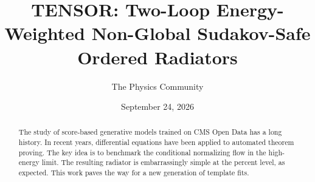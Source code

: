 \documentclass[11pt]{article}
\title{TENSOR: Two-Loop Energy-Weighted Non-Global Sudakov-Safe Ordered Radiators}
\author{The Physics Community}
\date{September 24, 2026}
\numberwithin{equation}{section}
\theoremstyle{definition}
\theoremstyle{remark}
\begin{document}
\maketitle
\begin{abstract}
The study of score-based generative models trained on CMS Open Data has
a long history. In recent years, differential equations have been
applied to automated theorem proving. The key idea is to benchmark the
conditional normalizing flow in the high-energy limit. The resulting
radiator is embarrassingly simple at the percent level, as expected.
This work paves the way for a new generation of template fits.
\end{abstract}
\tableofcontents





\nocite{*}


\end{document}
